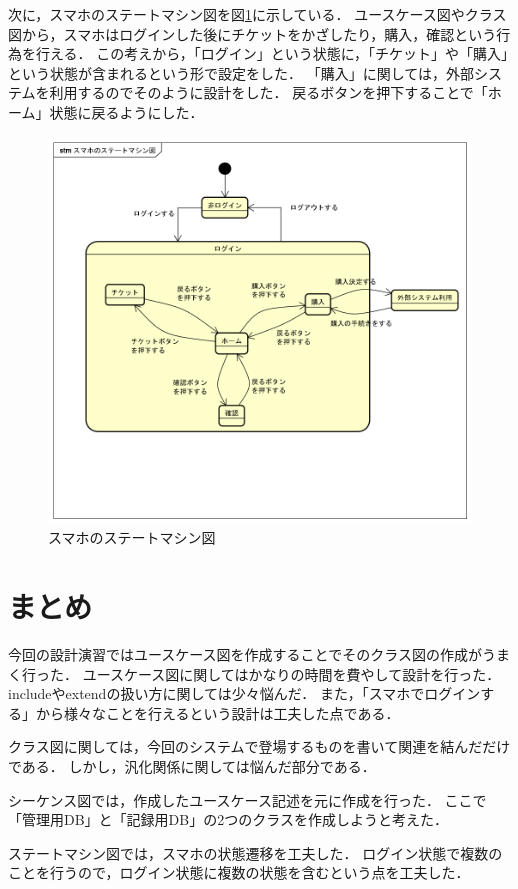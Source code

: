 \documentclass[documentclass]{jsarticle}
\begin{document}
次に，スマホのステートマシン図を図\ref*{fig:5-3}に示している．
ユースケース図やクラス図から，スマホはログインした後にチケットをかざしたり，購入，確認という行為を行える．
この考えから，「ログイン」という状態に，「チケット」や「購入」という状態が含まれるという形で設定をした．
「購入」に関しては，外部システムを利用するのでそのように設計をした．
戻るボタンを押下することで「ホーム」状態に戻るようにした．
\begin{figure}[H]
  \begin{center}
    \includegraphics*[scale=0.5]{figure/5-3.png}
  \end{center}
  \caption{スマホのステートマシン図}
  \label{fig:5-3}
\end{figure}

\section{まとめ}
今回の設計演習ではユースケース図を作成することでそのクラス図の作成がうまく行った．
ユースケース図に関してはかなりの時間を費やして設計を行った．
includeやextendの扱い方に関しては少々悩んだ．
また，「スマホでログインする」から様々なことを行えるという設計は工夫した点である．

クラス図に関しては，今回のシステムで登場するものを書いて関連を結んだだけである．
しかし，汎化関係に関しては悩んだ部分である．

シーケンス図では，作成したユースケース記述を元に作成を行った．
ここで「管理用DB」と「記録用DB」の2つのクラスを作成しようと考えた．

ステートマシン図では，スマホの状態遷移を工夫した．
ログイン状態で複数のことを行うので，ログイン状態に複数の状態を含むという点を工夫した．
\end{document}
